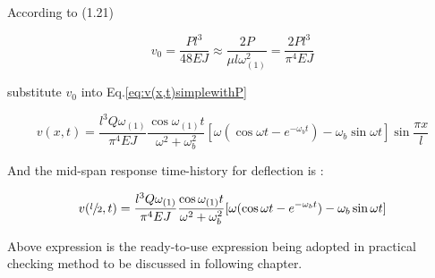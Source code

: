 According to (1.21)

\begin{equation}
    v_0 = \frac{Pl^3}{48EJ} \approx \frac{2P}{\mu l \omega_{(1)}^2} = \frac{2Pl^3}{\pi ^4 EJ}
\end{equation}

substitute $v_0$ into Eq.\ref{eq:v(x,t)simplewithP}

\begin{equation}\label{eq:v(x,t)simpleharmonic}
    v(x,t) = \frac{l^3Q\omega_{(1)}}{\pi^4 EJ}\frac{\cos \omega_{(1)}t}{\omega^2+\omega_b^2}[\omega(\cos\omega t - e^{-\omega_b t})-\omega_b\sin\omega t]\sin\frac{\pi x}{l}
\end{equation}

And the mid-span response time-history for deflection is :

\begin{equation}\label{eq:v(x,t)simpleharmonic}
    v(\sfrac{l}{2},t) = \frac{l^3Q\omega_{(1)}}{\pi^4 EJ}\frac{\cos \omega_{(1)}t}{\omega^2+\omega_b^2}[\omega(\cos\omega t - e^{-\omega_b t})-\omega_b\sin\omega t]
\end{equation}

Above expression is the ready-to-use expression being adopted in practical checking method to be discussed in following chapter.









